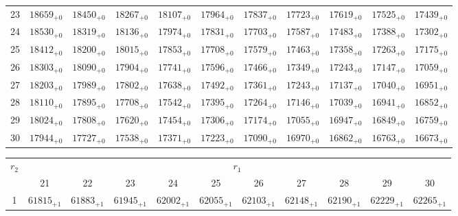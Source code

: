\documentclass[10pt, a4paper]{article}
\begin{document}
\begin{center}
\begin{tabular}{c || c c c c c | c c c c c}
        23 & \({18659}_{+0}\) & \({18450}_{+0}\) & \({18267}_{+0}\) & \({18107}_{+0}\) & \({17964}_{+0}\) & \({17837}_{+0}\) & \({17723}_{+0}\) & \({17619}_{+0}\) & \({17525}_{+0}\) & \({17439}_{+0}\)\\
        24 & \({18530}_{+0}\) & \({18319}_{+0}\) & \({18136}_{+0}\) & \({17974}_{+0}\) & \({17831}_{+0}\) & \({17703}_{+0}\) & \({17587}_{+0}\) & \({17483}_{+0}\) & \({17388}_{+0}\) & \({17302}_{+0}\)\\
        25 & \({18412}_{+0}\) & \({18200}_{+0}\) & \({18015}_{+0}\) & \({17853}_{+0}\) & \({17708}_{+0}\) & \({17579}_{+0}\) & \({17463}_{+0}\) & \({17358}_{+0}\) & \({17263}_{+0}\) & \({17175}_{+0}\)\\
        \hline
        26 & \({18303}_{+0}\) & \({18090}_{+0}\) & \({17904}_{+0}\) & \({17741}_{+0}\) & \({17596}_{+0}\) & \({17466}_{+0}\) & \({17349}_{+0}\) & \({17243}_{+0}\) & \({17147}_{+0}\) & \({17059}_{+0}\)\\
        27 & \({18203}_{+0}\) & \({17989}_{+0}\) & \({17802}_{+0}\) & \({17638}_{+0}\) & \({17492}_{+0}\) & \({17361}_{+0}\) & \({17243}_{+0}\) & \({17137}_{+0}\) & \({17040}_{+0}\) & \({16951}_{+0}\)\\
        28 & \({18110}_{+0}\) & \({17895}_{+0}\) & \({17708}_{+0}\) & \({17542}_{+0}\) & \({17395}_{+0}\) & \({17264}_{+0}\) & \({17146}_{+0}\) & \({17039}_{+0}\) & \({16941}_{+0}\) & \({16852}_{+0}\)\\
        29 & \({18024}_{+0}\) & \({17808}_{+0}\) & \({17620}_{+0}\) & \({17454}_{+0}\) & \({17306}_{+0}\) & \({17174}_{+0}\) & \({17055}_{+0}\) & \({16947}_{+0}\) & \({16849}_{+0}\) & \({16759}_{+0}\)\\
        30 & \({17944}_{+0}\) & \({17727}_{+0}\) & \({17538}_{+0}\) & \({17371}_{+0}\) & \({17223}_{+0}\) & \({17090}_{+0}\) & \({16970}_{+0}\) & \({16862}_{+0}\) & \({16763}_{+0}\) & \({16673}_{+0}\)\\
        \hline
    \end{tabular}
    \pagebreak
    \begin{tabular}{c || c c c c c | c c c c c}
        \multirow{2}{*}{\(r_2\)} & \multicolumn{10}{c}{\(r_1\)} \\
        & 21 & 22 & 23 & 24 & 25 & 26 & 27 & 28 & 29 & 30\\
        \hline\hline
        1 & \({61815}_{+1}\) & \({61883}_{+1}\) & \({61945}_{+1}\) & \({62002}_{+1}\) & \({62055}_{+1}\) & \({62103}_{+1}\) & \({62148}_{+1}\) & \({62190}_{+1}\) & \({62229}_{+1}\) & \({62265}_{+1}\)\\

\end{tabular}
\end{center}
\end{document}
